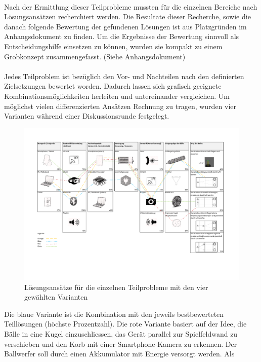 \\
Nach der Ermittlung dieser Teilprobleme mussten für die einzelnen Bereiche nach Lösungsansätzen
recherchiert werden. Die Resultate dieser Recherche, sowie die danach folgende Bewertung der
gefundenen Lösungen ist aus Platzgründen im Anhangsdokument zu finden. Um die Ergebnisse der Bewertung
sinnvoll als Entscheidungshilfe einsetzen zu können, wurden sie kompakt zu einem Grobkonzept
zusammengefasst. (Siehe Anhangsdokument)\\
\\
Jedes Teilproblem ist bezüglich den Vor- und Nachteilen nach den definierten Zielsetzungen
bewertet worden. Dadurch lassen sich grafisch geeignete Kombinationsmöglichkeiten herleiten und
untereinander vergleichen. Um möglichst vielen differenzierten Ansätzen Rechnung zu tragen,
wurden vier Varianten während einer Diskussionsrunde festgelegt.
\newpage
\begin{landscape}
	\begin{figure}[t]
		\centering
		\includegraphics[scale=0.89,clip,trim= 15mm 37mm 21mm 19mm]
		{Enddokumentation/Varianten/Bilder/Grobkonzept_v2.pdf}
		\caption{Lösungsansätze für die einzelnen Teilprobleme mit den vier gewählten Varianten}
		\label{fig:Grobkonzept}
	\end{figure}
\end{landscape}
\noindent Die blaue Variante ist die Kombination mit den jeweils bestbewerteten Teillösungen (höchste Prozentzahl).
 Die rote Variante basiert auf der Idee, die Bälle in eine Kugel einzuschliessen,
das Gerät parallel zur Spielfeldwand zu verschieben und den Korb mit einer Smartphone-Kamera zu
erkennen. Der Ballwerfer soll durch einen Akkumulator mit Energie versorgt werden. Als
